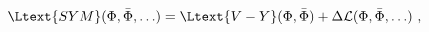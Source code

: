 \begin{equation}
  \label{eq:vygeneralization}
  \Ltext{SYM} (\Phi, \bar{\Phi}, \ldots) = \Ltext{V-Y}(\Phi, \bar{\Phi}) +
  \Delta \mathcal{L}(\Phi, \bar{\Phi}, \ldots)\ ,
\end{equation}

